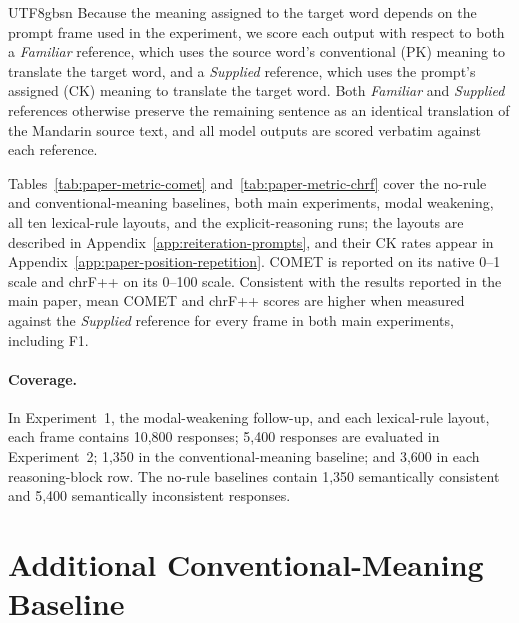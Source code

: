\documentclass[11pt]{article}
\begin{document}
\begin{CJK*}{UTF8}{gbsn}
Because the meaning assigned to the target word depends on the prompt frame used in the experiment, we score each output with respect to both a \emph{Familiar} reference, which uses the source word's conventional (PK) meaning to translate the target word, and a \emph{Supplied} reference, which uses the prompt's assigned (CK) meaning to translate the target word. Both \emph{Familiar} and \emph{Supplied} references otherwise preserve the remaining sentence as an identical translation of the Mandarin source text, and all model outputs are scored verbatim against each reference.

Tables~\ref{tab:paper-metric-comet} and~\ref{tab:paper-metric-chrf} cover the no-rule and conventional-meaning baselines, both main experiments, modal weakening, all ten lexical-rule layouts, and the explicit-reasoning runs; the layouts are described in Appendix~\ref{app:reiteration-prompts}, and their CK rates appear in Appendix~\ref{app:paper-position-repetition}. COMET is reported on its native 0--1 scale and chrF++ on its 0--100 scale. Consistent with the results reported in the main paper, mean COMET and chrF++ scores are higher when measured against the \emph{Supplied} reference for every frame in both main experiments, including F1.

\paragraph{Coverage.}
In Experiment~1, the modal-weakening follow-up, and each lexical-rule layout, each frame contains 10,800 responses; 5,400 responses are evaluated in Experiment~2; 1,350 in the conventional-meaning baseline; and 3,600 in each reasoning-block row. The no-rule baselines contain 1,350 semantically consistent and 5,400 semantically inconsistent responses.



\section{Additional Conventional-Meaning Baseline}
\label{app:paper-conventional-meaning}
 

\end{CJK*}
\end{document}
